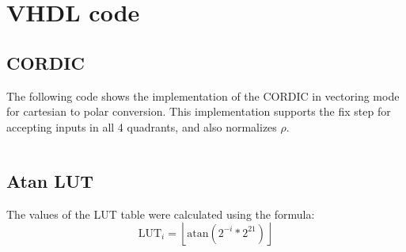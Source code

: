 \chapter{VHDL code}


\section{CORDIC}
The following code shows the implementation of the CORDIC in vectoring mode for cartesian to polar conversion. This implementation supports the fix step for accepting inputs in all 4 quadrants, and also normalizes \( \rho \).
\begin{code}
    \inputminted{vhdl}{../vhdl/src/CORDIC.vhd}
    \label{code:vhdl}
\end{code}


\section{Atan LUT}
The values of the LUT table were calculated using the formula:
\[
    \text{LUT}_i = \left\lfloor \text{atan}(2^{-i} * 2^21) \right\rfloor
\]
\begin{code}
    \inputminted{vhdl}{../vhdl/src/ATAN_LUT.vhd}
    \label{code:lut}
\end{code}
